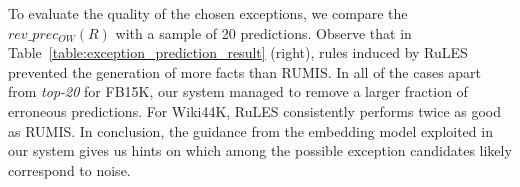To evaluate the quality of the chosen exceptions, we compare the $rev\_prec_{OW}(R)$ with a sample of 20 predictions. Observe that in Table~\ref{table:exception_prediction_result} (right), rules induced by RuLES prevented the generation of more facts than RUMIS. 
In all of the cases apart from \textit{top-20} for FB15K, our system 
managed to remove a larger fraction of erroneous predictions. 
For Wiki44K, RuLES consistently performs twice as good as RUMIS. 
In conclusion, the guidance from the embedding model 
exploited in our system 
gives us hints on which among the possible exception candidates likely correspond to noise.   











